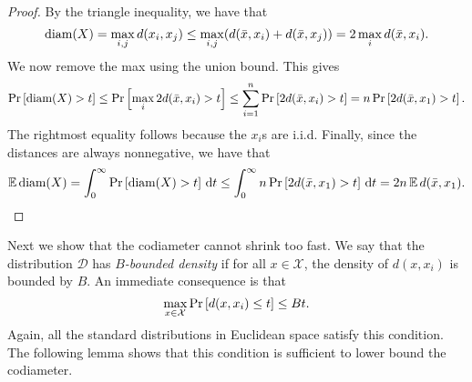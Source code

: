 \documentclass[../main.tex]{subfiles}
\newcommand{\set}[1]{\mathcal {#1}}
\newcommand{\distribution}[1]{\mathcal {#1}}
\newcommand{\dist}[2]{\distf({#1},{#2})}
\newcommand{\distf}{d}
\newcommand{\diam}[1]{\textnormal{diam}({#1})}
\begin{document}
\begin{proof}
    By the triangle inequality, we have that
    \begin{equation*}
        \diam{X}
        = 
        \max_{i,j} \dist{x_i}{x_j}
        \le
        \max_{i,j} (\dist{\bar x}{x_i} + \dist{\bar x}{x_j})
        =
        2\max_i \dist{\bar x}{x_i}
        .
    \end{equation*}
    We now remove the max using the union bound.
    This gives
    \begin{equation*}
        \prob{\diam{X} > t}
        \le
        \prob{\max_i 2\dist{\bar x}{x_i} > t}
        \le
        \sum_{i=1}^n\prob{2\dist{\bar x}{x_i} > t}
        \label{eq:Ediamub}
        =
        n\prob{2\dist{\bar x}{x_1} > t}
        .
    \end{equation*}
    The rightmost equality follows because the $x_i$s are i.i.d.
    Finally, since the distances are always nonnegative, we have that
    \begin{equation*}
        \E\diam{X} 
        = 
        \int_0^\infty \prob{\diam{X} > t} \dd t
        \le
        \int_0^\infty n\prob{2\dist{\bar x}{x_1} > t} \dd t
        =
        2n \E\dist{\bar x}{x_1}
        .
    \end{equation*}
\end{proof}


Next we show that the codiameter cannot shrink too fast.
We say that the distribution $\distribution D$ has \emph{$B$-bounded density} if
for all $x\in\set X$, the density of $\dist{x}{x_i}$ is bounded by $B$.
An immediate consequence is that 
\begin{equation}
    \max_{x\in\set X} \prob{\dist{x}{x_i} \le t} \le Bt
    .
\end{equation}
Again, all the standard distributions in Euclidean space satisfy this condition.
The following lemma shows that this condition is sufficient to lower bound the codiameter.
\end{document}
